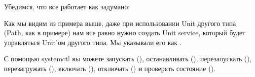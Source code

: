 \documentclass[letterpaper,10pt,russian]{sphinxmanual}
\begin{document}
\sphinxAtStartPar
{}

\sphinxAtStartPar
Убедимся, что все работает как задумано:

\sphinxAtStartPar
{}

\sphinxAtStartPar
Как мы видим из примера выше, даже при использовании Unit другого типа (Path, как в примере) нам все равно нужно создать Unit service, который будет управляться Unit’ом другого типа. Мы указывали его как .

\sphinxAtStartPar
С помощью systemctl вы можете запускать (), останавливать (), перезапускать (), перезагружать (), включать (), отключать () и проверять состояние ().
\end{document}
